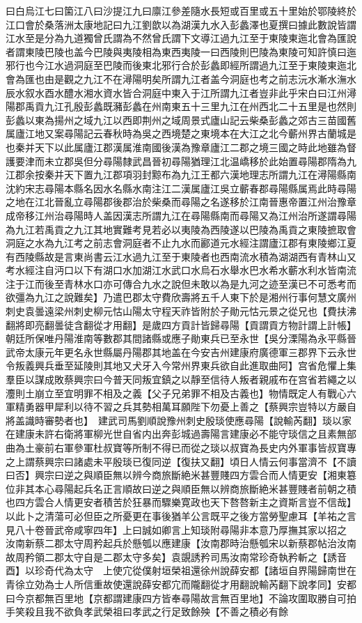 曰白烏江七曰箘江八曰沙提江九曰廪江參差隨水長短或百里或五十里始於鄂陵終於江口會於桑落洲太康地記曰九江劉歆以為湖漢九水入彭蠡澤也夏撰曰據此數說皆謂江水至是分為九道獨曾氏謂為不然曾氏謂下文導江過九江至于東陵東迤北會為匯說者謂東陵巴陵也盖今巴陵與夷陵相為東西夷陵一曰西陵則巴陵為東陵可知許慎曰迤邪行也今江水過洞庭至巴陵而後東北邪行合於彭蠡即經所謂過九江至于東陵東迤北會為匯也由是觀之九江不在潯陽明矣所謂九江者盖今洞庭也考之前志沅水漸水潕水辰水叙水酉水醴水湘水資水皆合洞庭中東入于江所謂九江者豈非此乎宋白曰江州潯陽郡禹貢九江孔殷彭蠡既瀦彭蠡在州南東五十三里九江在州西北二十五里是也然則彭蠡以東為揚州之域九江以西即荆州之域周景式廬山記云柴桑彭蠡之郊古三苗國舊属廬江地又案尋陽記云春秋時為吳之西境楚之東境本在大江之北今蘄州界古蘭城是也秦并天下以此属廬江郡漢属淮南國後漢為豫章廬江二郡之境三國之時此地雖為督護要津而未立郡吳但分尋陽隸武昌晉初尋陽猶理江北温嶠移於此始置尋陽郡隋為九江郡余按秦并天下置九江郡項羽封黥布為九江王都六漢地理志所謂九江在潯陽縣南沈約宋志尋陽本縣名因水名縣水南注江二漢属廬江吳立蘄春郡尋陽縣属焉此時尋陽之地在江北晉亂立尋陽郡後郡治於柴桑而尋陽之名遂移於江南晉惠帝置江州治豫章成帝移江州治尋陽時人盖因漢志所謂九江在尋陽縣南而尋陽又為江州治所遂謂尋陽為九江若禹貢之九江其地實難考見若必以夷陵為西陵遂以巴陵為禹貢之東陵摭取會洞庭之水為九江考之前志會洞庭者不止九水而酈道元水經注謂廬江郡有東陵鄉江夏有西陵縣故是言東尚書云江水過九江至于東陵者也西南流水積為湖湖西有青林山又考水經注自沔口以下有湖口水加湖江水武口水烏石水舉水巴水希水蘄水利水皆南流注于江而後至青林水口亦可傳合九水之說但未敢以為是九河之迹至漢已不可悉考而欲彊為九江之說難矣】乃遣巴郡太守費欣壽將五千人東下於是湘州行事何慧文廣州刺史袁曇遠梁州刺史柳元怙山陽太守程天祚皆附於子勛元怙元景之從兄也【費扶沸翻將即亮翻曇徒含翻從才用翻】是歲四方貢計皆歸尋陽【貢謂貢方物計謂上計帳】朝廷所保唯丹陽淮南等數郡其間諸縣或應子勛東兵已至永世【吳分溧陽為永平縣晉武帝太康元年更名永世縣屬丹陽郡其地盖在今安吉州建康府廣德軍三郡界下云永世令叛義興兵垂至延陵則其地又犬牙入今常州界東兵欲自此進取曲阿】宫省危懼上集羣臣以謀成敗蔡興宗曰今普天同叛宜鎮之以靜至信待人叛者親戚布在宫省若繩之以灋則土崩立至宜明罪不相及之義【父子兄弟罪不相及古義也】物情既定人有戰心六軍精勇器甲犀利以待不習之兵其勢相萬耳願陛下勿憂上善之【蔡興宗豈特以方嚴自將盖識時審勢者也】　建武司馬劉順說豫州刺史殷琰使應尋陽【說輸芮翻】琰以家在建康未許右衛將軍柳光世自省内出奔彭城過壽陽言建康必不能守琰信之且素無部曲為土豪前右軍參軍杜叔寶等所制不得已而從之琰以叔寶為長史内外軍事皆叔寶專之上謂蔡興宗曰諸處未平殷琰已復同逆【復扶又翻】頃日人情云何事當濟不【不讀曰否】興宗曰逆之與順臣無以辨今商旅斷絶米甚豐賤四方雲合而人情更安【湘東簒位非其本心尋陽起兵名正言順故曰逆之與順臣無以辨商旅斷絶米甚豐賤者前朝之積也四方雲合人情更安者積苦於狂暴而驟樂寛政也天下嗸嗸新主之資斯言豈不信哉】以此卜之清蕩可必但臣之所憂更在事後猶羊公言既平之後方當勞聖慮耳【羊祐之言見八十卷晉武帝咸寧四年】上曰誠如卿言上知琰附尋陽非本意乃厚撫其家以招之　汝南新蔡二郡太守周矜起兵於懸瓠以應建康【汝南郡時治懸瓠宋以新蔡郡帖治汝南故周矜領二郡太守自是二郡太守多矣】袁覬誘矜司馬汝南常珍奇執矜斬之【誘音酉】以珍奇代為太守　上使宂從僕射垣榮祖還徐州說薛安都【諸垣自界陽歸南世在青徐立効為士人所信重故使還說薛安都宂而隴翻從才用翻說輸芮翻下說孝同】安都曰今京都無百里地【京都謂建康四方皆奉尋陽故言無百里地】不論攻圍取勝自可拍手笑殺且我不欲負孝武榮祖曰孝武之行足致餘殃【不善之積必有餘